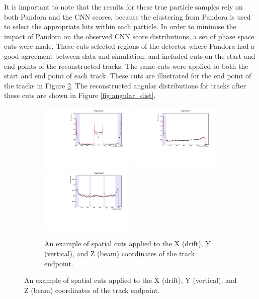 It is important to note that the results for these true particle samples rely 
on both Pandora and the CNN scores, because the clustering from Pandora is 
used to select the appropriate hits within each particle. In order to minimise
the impact of Pandora on the observed CNN score distributions, a set of phase
space cuts were made. These cuts selected regions of the detector where 
Pandora had a good agreement between data and simulation, and included cuts on 
the start and end points of the reconstructed tracks. The same cuts were 
applied to both the start and end point of each track. These cuts are 
illustrated for the end point of the tracks in Figure \ref{fig:spatial_cuts}. 
The reconstructed angular distributions for tracks after these cuts are shown 
in Figure \ref{fig:angular_dist}.

\begin{figure}

	\begin{subfigure}[b]{\textwidth}
		\centering
		\includegraphics[width=0.49\textwidth]{figures/endX_nocuts.pdf}
		\hfill
		\includegraphics[width=0.49\textwidth]{figures/endY_nocuts.pdf}
		\includegraphics[width=0.49\textwidth]{figures/endZ_nocuts.pdf}
		\caption {An example of spatial cuts applied to the X (drift), Y (vertical),
		and Z (beam) coordinates of the track endpoint.}
		\label{fig:spatial_cuts}
	\end{subfigure}


\end{figure}
